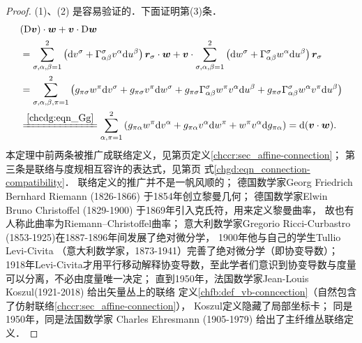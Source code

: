 \begin{proof}
    (1)、(2) 是容易验证的．下面证明第(3)条．
    \begin{align*}
        & ({\rm D} \boldsymbol{v}) \cdot \boldsymbol{w} + \boldsymbol{v} \cdot {\rm D} \boldsymbol{w} \\
        &=  \sum_{\sigma,\alpha,\beta=1}^{2} \left(\mathrm{d} v^\sigma  
        +  \Gamma_{\alpha \beta}^\sigma v^\alpha \mathrm{d} u^\beta  \right) \boldsymbol{r}_\sigma 
         \cdot \boldsymbol{w} + \boldsymbol{v} \cdot 
           \sum_{\sigma,\alpha,\beta=1}^{2} \left(\mathrm{d} w^\sigma  
           +  \Gamma_{\alpha \beta}^\sigma w^\alpha \mathrm{d} u^\beta  \right) \boldsymbol{r}_\sigma \\
         &= \sum_{\sigma,\alpha,\beta,\pi=1}^{2} \left( g_{\pi \sigma} w^\pi  \mathrm{d} v^\sigma  
          +  g_{\pi \sigma} v^\pi  \mathrm{d} w^\sigma  
          +  g_{\pi \sigma} \Gamma_{\alpha \beta}^\sigma w^\pi v^\alpha \mathrm{d} u^\beta 
          +  g_{\pi \sigma} \Gamma_{\alpha \beta}^\sigma w^\alpha v^\pi \mathrm{d} u^\beta  \right)  \\  
         &\xlongequal{\ref{chcdg:eqn_Gg}}
         \sum_{\alpha,\pi=1}^{2} \left( g_{\pi \alpha} w^\pi  \mathrm{d} v^\alpha  
         +  g_{\pi \alpha} v^\alpha  \mathrm{d} w^\pi  
         +  w^\pi v^\alpha \mathrm{d} g_{\pi \alpha}   \right)  
         =\mathrm{d} (\boldsymbol{v} \cdot \boldsymbol{w}) .
    \end{align*} 
    本定理中前两条被推广成{\kaishu 联络}定义，见第\pageref{chccr:sec_affine-connection}页定义\ref{chccr:sec_affine-connection}；
第三条是联络与度规相互容许的表达式，见第\pageref{chgd:eqn_connection-compatibility}页
式\eqref{chgd:eqn_connection-compatibility}．
    联络定义的推广并不是一帆风顺的；
    德国数学家Georg Friedrich Bernhard Riemann (1826-1866) 于1854年创立黎曼几何；
    德国数学家Elwin Bruno Christoffel (1829-1900) 于1869年引入克氏符，用来定义黎曼曲率，
    故也有人称此曲率为Riemann--Christoffel曲率；
    意大利数学家Gregorio Ricci-Curbastro (1853-1925)在1887-1896年间发展了绝对微分学，
    1900年他与自己的学生Tullio Levi-Civita （意大利数学家，1873-1941）完善了绝对微分学（即协变导数）；
    1918年Levi-Civita才用平行移动解释协变导数，至此学者们意识到协变导数与度量可以分离，不必由度量唯一决定；
    直到1950年，法国数学家Jean-Louis Koszul(1921-2018) 给出矢量丛上的联络
    定义\ref{chfb:def_vb-conncection}（自然包含了仿射联络\ref{chccr:sec_affine-connection}），
    Koszul定义隐藏了局部坐标卡；
    同是1950年，同是法国数学家 Charles Ehresmann (1905-1979) 给出了主纤维丛联络定义．
\end{proof}

